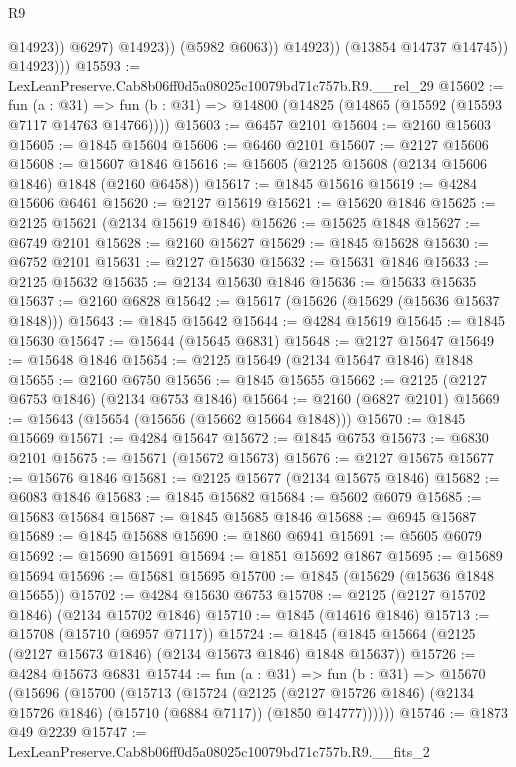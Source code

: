 \begin{lexlean}{R9}
\begin{coremodule}
                            @14923))
                        @6297)
                      @14923))
                  (@5982 @6063))
                @14923))
            (@13854 @14737 @14745))
          @14923)))
@15593 := LexLeanPreserve.Cab8b06ff0d5a08025c10079bd71c757b.R9.__rel_29
@15602 := fun (a : @31) =>
  fun (b : @31) => @14800 (@14825 (@14865 (@15592 (@15593 @7117 @14763 @14766))))
@15603 := @6457 @2101
@15604 := @2160 @15603
@15605 := @1845 @15604
@15606 := @6460 @2101
@15607 := @2127 @15606
@15608 := @15607 @1846
@15616 := @15605 (@2125 @15608 (@2134 @15606 @1846) @1848 (@2160 @6458))
@15617 := @1845 @15616
@15619 := @4284 @15606 @6461
@15620 := @2127 @15619
@15621 := @15620 @1846
@15625 := @2125 @15621 (@2134 @15619 @1846)
@15626 := @15625 @1848
@15627 := @6749 @2101
@15628 := @2160 @15627
@15629 := @1845 @15628
@15630 := @6752 @2101
@15631 := @2127 @15630
@15632 := @15631 @1846
@15633 := @2125 @15632
@15635 := @2134 @15630 @1846
@15636 := @15633 @15635
@15637 := @2160 @6828
@15642 := @15617 (@15626 (@15629 (@15636 @15637 @1848)))
@15643 := @1845 @15642
@15644 := @4284 @15619
@15645 := @1845 @15630
@15647 := @15644 (@15645 @6831)
@15648 := @2127 @15647
@15649 := @15648 @1846
@15654 := @2125 @15649 (@2134 @15647 @1846) @1848
@15655 := @2160 @6750
@15656 := @1845 @15655
@15662 := @2125 (@2127 @6753 @1846) (@2134 @6753 @1846)
@15664 := @2160 (@6827 @2101)
@15669 := @15643 (@15654 (@15656 (@15662 @15664 @1848)))
@15670 := @1845 @15669
@15671 := @4284 @15647
@15672 := @1845 @6753
@15673 := @6830 @2101
@15675 := @15671 (@15672 @15673)
@15676 := @2127 @15675
@15677 := @15676 @1846
@15681 := @2125 @15677 (@2134 @15675 @1846)
@15682 := @6083 @1846
@15683 := @1845 @15682
@15684 := @5602 @6079
@15685 := @15683 @15684
@15687 := @1845 @15685 @1846
@15688 := @6945 @15687
@15689 := @1845 @15688
@15690 := @1860 @6941
@15691 := @5605 @6079
@15692 := @15690 @15691
@15694 := @1851 @15692 @1867
@15695 := @15689 @15694
@15696 := @15681 @15695
@15700 := @1845 (@15629 (@15636 @1848 @15655))
@15702 := @4284 @15630 @6753
@15708 := @2125 (@2127 @15702 @1846) (@2134 @15702 @1846)
@15710 := @1845 (@14616 @1846)
@15713 := @15708 (@15710 (@6957 @7117))
@15724 := @1845 (@1845 @15664 (@2125 (@2127 @15673 @1846) (@2134 @15673 @1846) @1848 @15637))
@15726 := @4284 @15673 @6831
@15744 := fun (a : @31) =>
  fun (b : @31) =>
  @15670
    (@15696
      (@15700
        (@15713
          (@15724
            (@2125
              (@2127 @15726 @1846)
              (@2134 @15726 @1846)
              (@15710 (@6884 @7117))
              (@1850 @14777))))))
@15746 := @1873 @49 @2239
@15747 := LexLeanPreserve.Cab8b06ff0d5a08025c10079bd71c757b.R9.__fits_2

\end{coremodule}
\end{lexlean}
